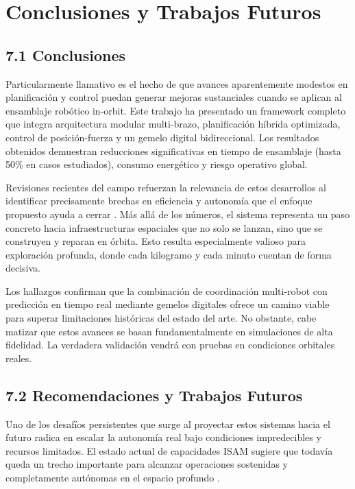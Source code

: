 \section{Conclusiones y Trabajos Futuros}

\subsection{7.1 Conclusiones}

Particularmente llamativo es el hecho de que avances aparentemente modestos en planificación y control puedan generar mejoras sustanciales cuando se aplican al ensamblaje robótico in-orbit. Este trabajo ha presentado un framework completo que integra arquitectura modular multi-brazo, planificación híbrida optimizada, control de posición-fuerza y un gemelo digital bidireccional. Los resultados obtenidos demuestran reducciones significativas en tiempo de ensamblaje (hasta 50\% en casos estudiados), consumo energético y riesgo operativo global.

Revisiones recientes del campo refuerzan la relevancia de estos desarrollos al identificar precisamente brechas en eficiencia y autonomía que el enfoque propuesto ayuda a cerrar \cite{Wang2025_OASR}. Más allá de los números, el sistema representa un paso concreto hacia infraestructuras espaciales que no solo se lanzan, sino que se construyen y reparan en órbita. Esto resulta especialmente valioso para exploración profunda, donde cada kilogramo y cada minuto cuentan de forma decisiva.

Los hallazgos confirman que la combinación de coordinación multi-robot con predicción en tiempo real mediante gemelos digitales ofrece un camino viable para superar limitaciones históricas del estado del arte. No obstante, cabe matizar que estos avances se basan fundamentalmente en simulaciones de alta fidelidad. La verdadera validación vendrá con pruebas en condiciones orbitales reales.

\subsection{7.2 Recomendaciones y Trabajos Futuros}

Uno de los desafíos persistentes que surge al proyectar estos sistemas hacia el futuro radica en escalar la autonomía real bajo condiciones impredecibles y recursos limitados. El estado actual de capacidades ISAM sugiere que todavía queda un trecho importante para alcanzar operaciones sostenidas y completamente autónomas en el espacio profundo \cite{NASA_ISAM2025}.

